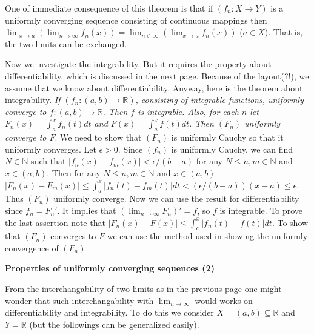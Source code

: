 \documentclass{article}
\newcommand{\NaN}{\mathbb{N}}
\newcommand{\ReR}{\mathbb{R}}
\begin{document}
One of immediate consequence of this theorem is that if $(f_n : X \to Y)$ is a uniformly converging sequence consisting of continuous mappings then $\lim_{x \to a} (\lim_{n \to \infty} f_n(x)) = \lim_{n \in \infty} (\lim_{x \to a} f_n(x))$ ($a \in X$).
That is, the two limits can be exchanged.

Now we investigate the integrability.
But it requires the property about differentiability, which is discussed in the next page.
Because of the layout(?!), we assume that we know about differentiability.
Anyway, here is the theorem about integrability.
\textit{If $(f_n : (a, b) \to \ReR)$, consisting of integrable functions, uniformly converge to $f : (a, b) \to \ReR$.
Then $f$ is integrable.
Also, for each $n$ let $F_n(x) = \int_a^x f_n(t) dt$ and $F(x) = \int_a^x f(t) dt$.
Then $(F_n)$ uniformly converge to $F$}.
We need to show that $(F_n)$ is uniformly Cauchy so that it uniformly converges.
Let $\epsilon > 0$.
Since $(f_n)$ is uniformly Cauchy, we can find $N \in \NaN$ such that $|f_n(x) - f_m(x)| < \epsilon/(b - a)$ for any $N \le n, m \in \NaN$ and $x \in (a, b)$.
Then for any $N \le n, m \in \NaN$ and $x \in (a, b)$ $|F_n(x) - F_m(x)| \le \int_a^x |f_n(t) - f_m(t)| dt < (\epsilon/(b - a))(x - a) \le \epsilon$.
Thus $(F_n)$ uniformly converge.
Now we can use the result for differentiability since $f_n = F_n'$.
It implies that $(\lim_{n \to \infty} F_n)' = f$, so $f$ is integrable.
To prove the last assertion note that $|F_n(x) - F(x)| \le \int_c^x |f_n(t) - f(t)| dt$.
To show that $(F_n)$ converges to $F$ we can use the method used in showing the uniformly convergence of $(F_n)$.

\newpage

\textbf{Properties of uniformly converging sequences (2)}

From the interchangability of two limits as in the previous page one might wonder that such interchangability with $\lim_{n \to \infty}$ would works on differentiability and integrability.
To do this we consider $X = (a, b) \subseteq \ReR$ and $Y = \ReR$ (but the followings can be generalized easily).
\end{document}
